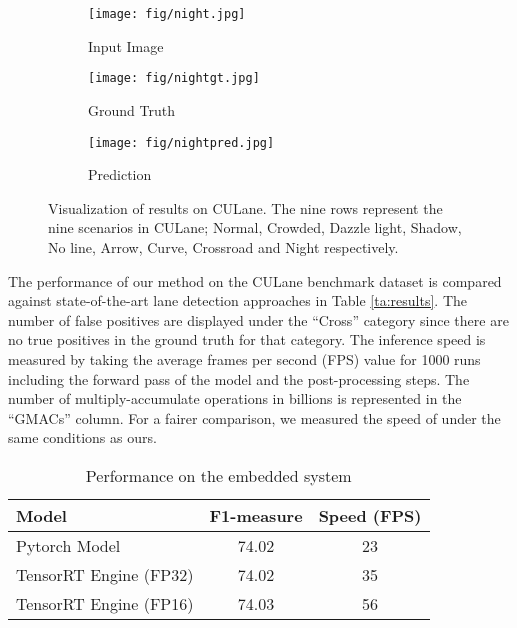 \documentclass[conference]{IEEEtran}
\begin{document}
\begin{figure}
     \begin{subfigure}[b]{0.32\linewidth}
         \centering
         \texttt{[image: fig/night.jpg]}
         \caption{Input Image}
         \label{sfi:sf1}
     \end{subfigure}\begin{subfigure}[b]{0.32\linewidth}
         \centering
         \texttt{[image: fig/nightgt.jpg]}
         \caption{Ground Truth}
         \label{sfi:sf2}
     \end{subfigure}\begin{subfigure}[b]{0.32\linewidth}
         \centering
         \texttt{[image: fig/nightpred.jpg]}
         \caption{Prediction}
         \label{sfi:sf3}
     \end{subfigure}\vspace{.3ex}
    
    \caption{ 
Visualization of results on CULane. The nine rows represent the nine scenarios in CULane; Normal, Crowded, Dazzle light, Shadow, No line, Arrow, Curve, Crossroad and Night respectively.\\}
    
\label{fi:pictorial_results}
    \vspace{-5ex}
\end{figure}

The performance of our method on the CULane benchmark dataset is compared against state-of-the-art lane detection approaches in Table \ref{ta:results}. The number of false positives are displayed under the ``Cross'' category since there are no true positives in the ground truth for that category. The inference speed is measured by taking the average frames per second (FPS) value for 1000 runs including the forward pass of the model and the post-processing steps. The number of multiply-accumulate operations in billions is represented in the ``GMACs'' column. For a fairer comparison, we measured the speed of \cite{qin2020ultra} under the same conditions as ours.

\begin{table}
\caption{Performance on the embedded system}
\vspace{-1ex}
\label{ta:opt}
\begin{center}
\normalsize
\begin{tabular}{|l|c|c|}
\hline
\textbf{Model} & \textbf{F1-measure} & \textbf{Speed (FPS)} \\
\hline
Pytorch Model & 74.02 & 23   \\
\hline
TensorRT Engine (FP32) & 74.02 & 35  \\
\hline
TensorRT Engine (FP16) & 74.03 & 56  \\
\hline

\end{tabular}
\end{center}
\vspace{-4ex}
\end{table}
\end{document}
